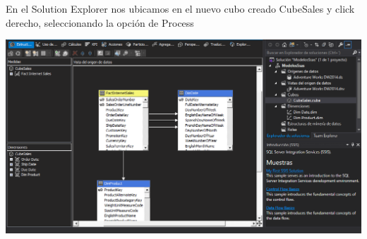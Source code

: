En el Solution Explorer nos ubicamos en el nuevo cubo creado CubeSales y click derecho, seleccionando la opción de Process
		\begin{center}
	\includegraphics[width=\columnwidth]{images/task1/18}
	\end{center}	
	

	

